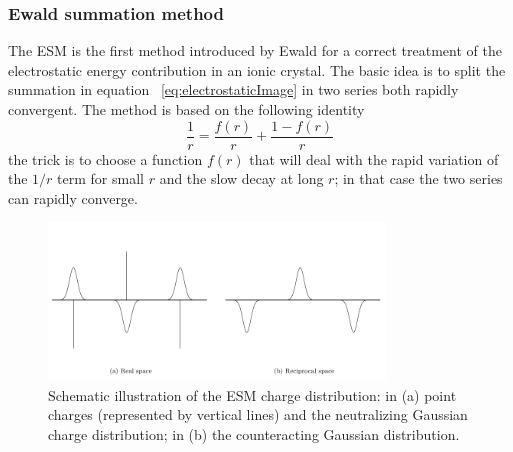 \subsubsection{Ewald summation method} %
The \acf{ESM} is the first method introduced by Ewald for a correct treatment of the electrostatic energy 
contribution in an ionic crystal. The basic idea is to split the summation in equation~ 
\eqref{eq:electrostaticImage} in two series both rapidly convergent. The method is based on the following identity
\begin{equation}
	\frac{1}{r} = \frac{f(r)}{r} + \frac{1 - f(r)}{r}
	\label{eq:ewaldTrick}
\end{equation}
the trick is to choose a function $f(r)$ that will deal with the rapid variation of the $1/r$ term for small $r$ 
and the slow decay at long $r$; in that case the two series can rapidly converge.
\begin{figure}[!ht]
	\centering
	\includegraphics[width=0.8\textwidth]{./img/EwaldSum/EwaldSum}
	\caption{Schematic illustration of the \acs{ESM} charge distribution: in (a) point charges (represented by vertical lines) and the neutralizing Gaussian charge distribution; in (b) the counteracting Gaussian distribution.}
	\label{fig:ewald}
\end{figure}

